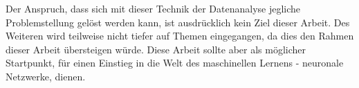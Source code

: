 \noindent
Der Anspruch, dass sich mit dieser Technik der Datenanalyse jegliche Problemstellung gelöst werden kann, ist ausdrücklich kein Ziel dieser Arbeit. 
Des Weiteren wird teilweise nicht tiefer auf Themen eingegangen, da dies den Rahmen dieser Arbeit übersteigen würde. 
Diese Arbeit sollte aber als möglicher Startpunkt, für einen Einstieg in die Welt des maschinellen Lernens - neuronale Netzwerke, dienen. 






